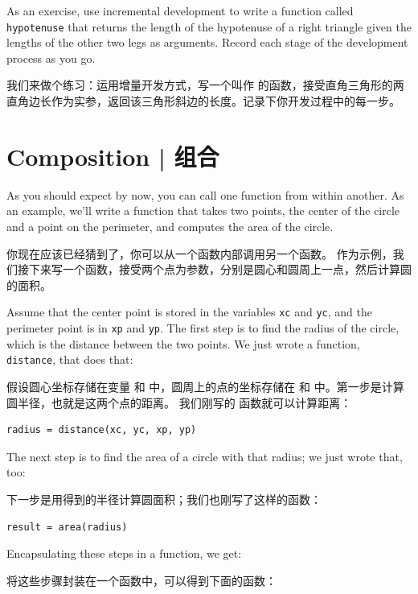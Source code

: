 As an exercise, use incremental development to write a function
called {\tt hypotenuse} that returns the length of the hypotenuse of a
right triangle given the lengths of the other two legs as arguments.
Record each stage of the development process as you go.

我们来做个练习：运用增量开发方式，写一个叫作  的函数，接受直角三角形的两直角边长作为实参，返回该三角形斜边的长度。记录下你开发过程中的每一步。



\section{Composition  |  组合}
  

As you should expect by now, you can call one function from within
another.  As an example, we'll write a function that takes two points,
the center of the circle and a point on the perimeter, and computes
the area of the circle.

你现在应该已经猜到了，你可以从一个函数内部调用另一个函数。
作为示例，我们接下来写一个函数，接受两个点为参数，分别是圆心和圆周上一点，然后计算圆的面积。

Assume that the center point is stored in the variables {\tt xc} and
{\tt yc}, and the perimeter point is in {\tt xp} and {\tt yp}. The
first step is to find the radius of the circle, which is the distance
between the two points.  We just wrote a function, {\tt
distance}, that does that:

假设圆心坐标存储在变量  和  中，圆周上的点的坐标存储在  和  中。第一步是计算圆半径，也就是这两个点的距离。
我们刚写的  函数就可以计算距离：


\begin{lstlisting}
radius = distance(xc, yc, xp, yp)
\end{lstlisting}

%
The next step is to find the area of a circle with that radius;
we just wrote that, too:

下一步是用得到的半径计算圆面积；我们也刚写了这样的函数：

\begin{lstlisting}
result = area(radius)
\end{lstlisting}

%
Encapsulating these steps in a function, we get:

将这些步骤封装在一个函数中，可以得到下面的函数：
  

